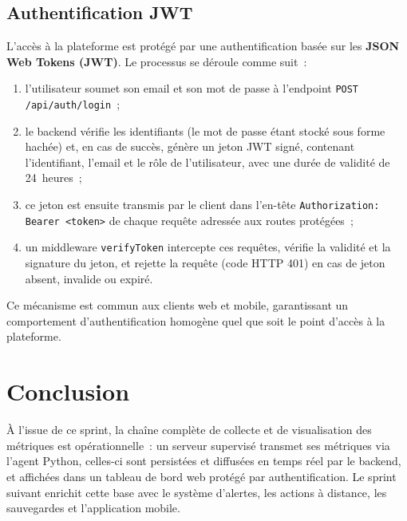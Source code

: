 \subsection{Authentification JWT}

L'accès à la plateforme est protégé par une authentification basée sur les \textbf{JSON Web Tokens (JWT)}. Le processus se déroule comme suit~:

\begin{enumerate}
  \item l'utilisateur soumet son email et son mot de passe à l'endpoint \texttt{POST /api/auth/login}~;
  \item le backend vérifie les identifiants (le mot de passe étant stocké sous forme hachée) et, en cas de succès, génère un jeton JWT signé, contenant l'identifiant, l'email et le rôle de l'utilisateur, avec une durée de validité de 24~heures~;
  \item ce jeton est ensuite transmis par le client dans l'en-tête \texttt{Authorization: Bearer <token>} de chaque requête adressée aux routes protégées~;
  \item un middleware \texttt{verifyToken} intercepte ces requêtes, vérifie la validité et la signature du jeton, et rejette la requête (code HTTP 401) en cas de jeton absent, invalide ou expiré.
\end{enumerate}

Ce mécanisme est commun aux clients web et mobile, garantissant un comportement d'authentification homogène quel que soit le point d'accès à la plateforme.

\section*{Conclusion}

À l'issue de ce sprint, la chaîne complète de collecte et de visualisation des métriques est opérationnelle~: un serveur supervisé transmet ses métriques via l'agent Python, celles-ci sont persistées et diffusées en temps réel par le backend, et affichées dans un tableau de bord web protégé par authentification. Le sprint suivant enrichit cette base avec le système d'alertes, les actions à distance, les sauvegardes et l'application mobile.
